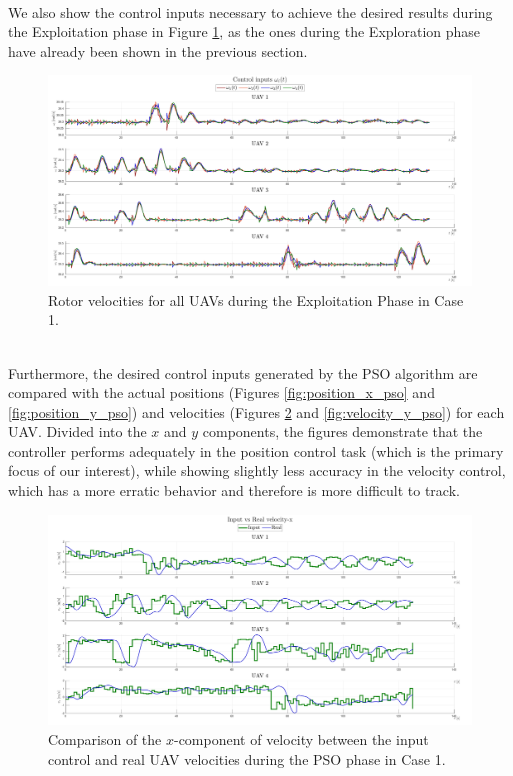 \documentclass[main]{subfiles}
\begin{document}
\noindent\\
We also show the control inputs necessary to achieve the desired
results during the Exploitation phase in Figure \ref{fig:rotor_vel_pso}, as the 
ones during the Exploration phase have already been shown in the previous section.
\begin{figure}
    \centering
    \includegraphics[width=\textwidth]{images/rotor_vels_pso.pdf}
    \caption[rotor_vel Case 1]{Rotor velocities for all UAVs during the Exploitation Phase in Case 1.}
    \label{fig:rotor_vel_pso}
\end{figure}

\noindent\\
Furthermore, the desired control inputs generated by the PSO algorithm are 
compared with the actual positions (Figures \ref{fig:position_x_pso} and \ref{fig:position_y_pso}) and 
velocities (Figures \ref{fig:velocity_x_pso} and \ref{fig:velocity_y_pso}) for each UAV. 
Divided into the $x$ and $y$ components, the figures demonstrate that the controller 
performs adequately in the position control task (which is the primary focus of our interest), 
while showing slightly less accuracy in the velocity control, which has a more erratic behavior and therefore is more 
difficult to track.
\begin{figure}
    \centering
    \includegraphics[width=\textwidth]{images/comparison_velocity-x_pso.pdf}
    \caption[Velocity-X Case 1]{Comparison of the $x$-component of velocity between the input control and real UAV velocities during the PSO phase in Case 1.}
    \label{fig:velocity_x_pso}
\end{figure}
\end{document}

